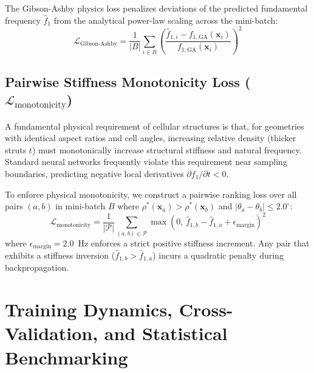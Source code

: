 \documentclass[preprint,12pt,3p]{elsarticle}
\begin{document}
The Gibson-Ashby physics loss penalizes deviations of the predicted fundamental frequency $\hat{f}_1$ from the analytical power-law scaling across the mini-batch:
\begin{equation}
  \mathcal{L}_{\text{Gibson-Ashby}} = \frac{1}{|B|} \sum_{i \in B} \left( \frac{\hat{f}_{1,i} - f_{1,\text{GA}}(\mathbf{x}_i)}{f_{1,\text{GA}}(\mathbf{x}_i)} \right)^2
  \label{eq:loss_ga}
\end{equation}

\subsection{Pairwise Stiffness Monotonicity Loss ($\mathcal{L}_{\text{monotonicity}}$)}
A fundamental physical requirement of cellular structures is that, for geometries with identical aspect ratios and cell angles, increasing relative density (thicker struts $t$) must monotonically increase structural stiffness and natural frequency. Standard neural networks frequently violate this requirement near sampling boundaries, predicting negative local derivatives $\partial f_1 / \partial t < 0$.

To enforce physical monotonicity, we construct a pairwise ranking loss over all pairs $(a, b)$ in mini-batch $B$ where $\rho^*(\mathbf{x}_a) > \rho^*(\mathbf{x}_b)$ and $|\theta_a - \theta_b| \le 2.0^\circ$:
\begin{equation}
  \mathcal{L}_{\text{monotonicity}} = \frac{1}{|\mathcal{P}|} \sum_{(a, b) \in \mathcal{P}} \max\left( 0, \, \hat{f}_{1,b} - \hat{f}_{1,a} + \epsilon_{\text{margin}} \right)^2
  \label{eq:loss_mono}
\end{equation}
where $\epsilon_{\text{margin}} = 2.0$~Hz enforces a strict positive stiffness increment. Any pair that exhibits a stiffness inversion ($\hat{f}_{1,b} > \hat{f}_{1,a}$) incurs a quadratic penalty during backpropagation.

\section{Training Dynamics, Cross-Validation, and Statistical Benchmarking}
\label{sec:training}
\end{document}
